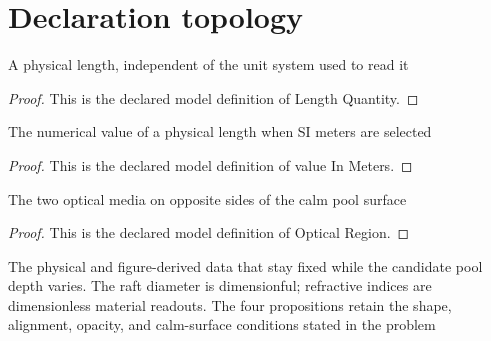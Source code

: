 \section{Declaration topology}
\begin{definition}
  \label{def:physics:phyx-mini-0015:phyxminiproblems-problemphyxmini0015-lengthquantity}
  A physical length, independent of the unit system used to read it
\end{definition}
\begin{proof}
  This is the declared model definition of Length Quantity.
\end{proof}
\begin{definition}
  \label{def:physics:phyx-mini-0015:phyxminiproblems-problemphyxmini0015-valueinmeters}
  The numerical value of a physical length when SI meters are selected
\end{definition}
\begin{proof}
  This is the declared model definition of value In Meters.
\end{proof}
\begin{definition}
  \label{def:physics:phyx-mini-0015:phyxminiproblems-problemphyxmini0015-opticalregion}
  The two optical media on opposite sides of the calm pool surface
\end{definition}
\begin{proof}
  This is the declared model definition of Optical Region.
\end{proof}
\begin{definition}
  \label{def:physics:phyx-mini-0015:phyxminiproblems-problemphyxmini0015-poolraftsetup}
  The physical and figure-derived data that stay fixed while the candidate pool depth varies. The raft diameter is dimensionful; refractive indices are dimensionless material readouts. The four propositions retain the shape, alignment, opacity, and calm-surface conditions stated in the problem
\end{definition}
